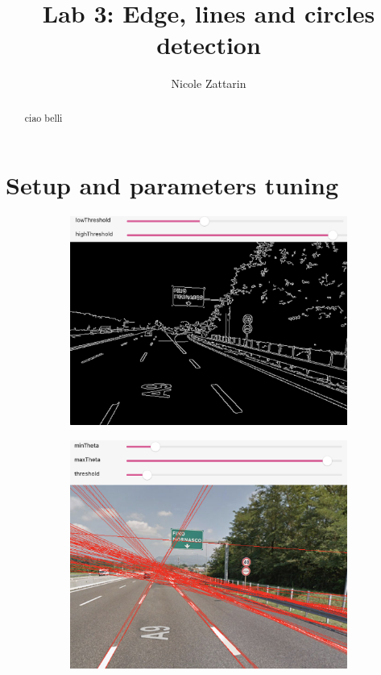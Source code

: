 \documentclass[twoside,onecolumn]{article}
\title{Lab 3: Edge, lines and circles detection } %
\author{Nicole Zattarin}
\date{}
\theoremstyle{definition}
\begin{document}
\maketitle

\begin{abstract}
ciao belli
\end{abstract}

\section{Setup and parameters tuning}
\begin{figure} \centering
\begin{subfigure}{0.5\textwidth}
  \includegraphics[width=\textwidth]{../results/tuningEdge.png}
\caption{ }\label{fig:tuningedge}
\end{subfigure} \quad
\begin{subfigure}{0.46\textwidth}
\includegraphics[width=\textwidth]{../results/tuningLines.png}
\caption{}\label{fig:tuningline}
\end{subfigure}\caption{}\label{fig:tuning}
\end{figure}
\end{document}
